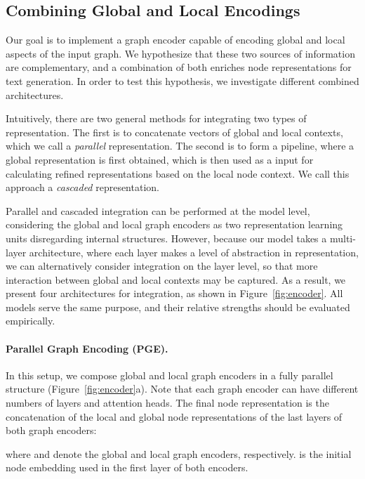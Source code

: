 \documentclass[11pt,a4paper]{article}
\begin{document}
 



\subsection{Combining Global and Local Encodings}
\label{sec:combiningenc}

Our goal is to implement a graph encoder capable of encoding global and local aspects of the input graph. We hypothesize that these two sources of information are complementary, and a combination of both enriches node representations for text generation. In order to test this hypothesis, we investigate different combined architectures. 



Intuitively, there are two general methods for integrating two types of representation. The first is to concatenate vectors of global and local contexts, which we call a {\it parallel} representation. The second is to form a pipeline, where a global representation is first obtained, which is then used as a input for calculating refined representations based on the local node context. We call this approach a {\it cascaded} representation. 

Parallel and cascaded integration can be performed at the model level, considering the global and local graph encoders as two representation learning units disregarding internal structures. However, because our model takes a multi-layer architecture, where each layer makes a level of abstraction in representation, we can alternatively consider integration on the layer level, so that more interaction between global and local contexts may be captured. As a result, we present four architectures for integration, as shown in Figure~\ref{fig:encoder}. All models serve the same purpose, and their relative strengths should be evaluated empirically.

\paragraph{Parallel Graph Encoding (PGE).} In this setup, we compose global and local graph encoders in a fully parallel structure (Figure~\ref{fig:encoder}a). Note that each graph encoder can have different numbers of layers and attention heads. The final node representation is the concatenation of the local and global node representations of the last layers of both graph encoders:

where  and  denote the global and local graph encoders, respectively.  is the initial node embedding used in the first layer of both encoders.
\end{document}
